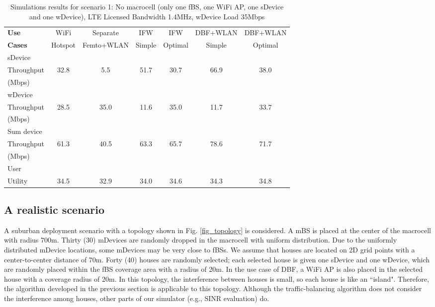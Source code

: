 \documentclass[journal,final,letterpaper,10pt,doublecolumn,twoside]{IEEEtran}
\begin{document}
\begin{table*}[ht]
\caption{Simulations results for scenario 1:  No macrocell (only one fBS, one WiFi AP, one sDevice and one wDevice), LTE Licensed Bandwidth 1.4MHz, wDevice Load 35Mbps} \centering
\begin{tabular}{|l|c|c|c|c|c|c|}
\hline
\textbf{Use} &WiFi   &   Separate   &  IFW   &  IFW   &  DBF+WLAN   & DBF+WLAN    \\
\textbf{Cases} & Hotspot  &    Femto+WLAN  &   Simple  &   Optimal  &   Simple  &  Optimal   \\\hline
sDevice &	 & 	 & 	 & 	 & 	 &    \\
Throughput  &32.8	 & 5.5	 & 51.7	 & 30.7	 & 66.9	 & 38.0   \\
(Mbps) &	 & 	 & 	 & 	 & 	 &    \\
\hline
wDevice &	 & 	 & 	 & 	 & 	 &    \\
Throughput & 28.5&	35.0&	11.6&	35.0&	11.7&	33.7   \\
(Mbps) &	 & 	 & 	 & 	 & 	 &    \\
\hline
Sum device &	 & 	 & 	 & 	 & 	 &    \\
Throughput &61.3 & 	40.5 & 	63.3 & 	65.7 & 	78.6 & 	71.7   \\
(Mbps) &	 & 	 & 	 & 	 & 	 &    \\
\hline
User &	 & 	 & 	 & 	 & 	 &    \\
Utility &34.5&	32.9&	34.0&	34.6&	34.3&	34.8   \\
\hline
\end{tabular}
\label{table:sim_1fBS1AP-noMacro}
\end{table*}




\subsection{A realistic scenario}
A suburban deployment scenario with a topology shown in Fig. \ref{fig_topology} is considered.
 A mBS is placed at the center
of the macrocell with radius 700m. Thirty (30)  mDevices are randomly
  dropped in the macrocell with uniform distribution. Due to the uniformly distributed mDevice locations,  some mDevices may be very close to fBSs.
We assume that  houses are located on 2D grid points
  with a center-to-center distance of 70m. Forty (40)  houses are randomly
  selected; each selected house is given one sDevice and one wDevice, which are randomly placed within the fBS coverage area with a
radius of 20m. In the use case of DBF, a WiFi AP is also placed in the selected house with a coverage radius of 20m. In this topology, the interference between houses is small, so each house is like an ``island". Therefore, the algorithm developed in the previous section is applicable to this topology. Although the traffic-balancing algorithm does not consider the interference among houses, other parts of our simulator (e.g., SINR evaluation) do.
\end{document}
